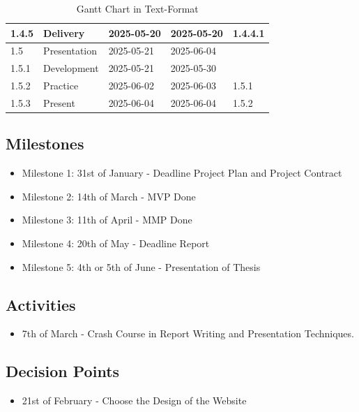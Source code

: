 \begin{table}[H]
\begin{tabular}{|l|l|l|l|l|}
        1.4.5 & Delivery & 2025-05-20 & 2025-05-20 & 1.4.4.1 \\ \hline
        1.5 & Presentation & 2025-05-21 & 2025-06-04 & ~ \\ \hline
        1.5.1 & Development & 2025-05-21 & 2025-05-30 & ~ \\ \hline
        1.5.2 & Practice & 2025-06-02 & 2025-06-03 & 1.5.1 \\ \hline
        1.5.3 & Present & 2025-06-04 & 2025-06-04 & 1.5.2 \\ \hline
    \end{tabular}
    \caption{Gantt Chart in Text-Format}
    \label{tab:gantt_text}
\end{table}



\subsection{Milestones}
\begin{itemize}
    \item Milestone 1: 31st of January - Deadline Project Plan and Project Contract
    \item Milestone 2: 14th of March - MVP Done
    \item Milestone 3: 11th of April - MMP Done
    \item Milestone 4: 20th of May - Deadline Report
    \item Milestone 5: 4th or 5th of June - Presentation of Thesis
\end{itemize}

\subsection{Activities}
\begin{itemize}
    \item 7th of March - Crash Course in Report Writing and Presentation Techniques.
\end{itemize}

\subsection{Decision Points}
\begin{itemize}
    \item 21st of February - Choose the Design of the Website
\end{itemize}

\newpage
